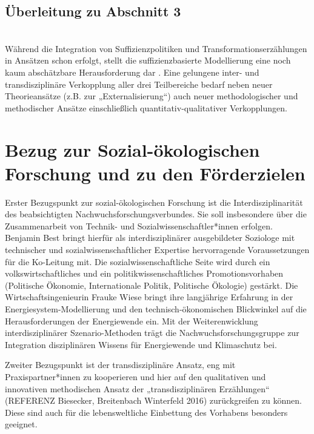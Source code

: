 \documentclass[a4paper,11pt,twoside]{scrartcl}
\begin{document}

\subsection*{Überleitung zu Abschnitt 3}\\
Während die Integration von Suffizienzpolitiken und Transformationserzählungen in Ansätzen schon erfolgt, stellt die suffizienzbasierte Modellierung eine noch kaum abschätzbare Herausforderung dar \cite{Samadi2017}. Eine gelungene inter- und transdisziplinäre Verkopplung aller drei Teilbereiche bedarf neben neuer Theorieansätze (z.B. zur „Externalisierung“) auch neuer methodologischer und methodischer Ansätze einschließlich quantitativ-qualitativer Verkopplungen.

\section{Bezug zur Sozial-ökologischen Forschung und zu den Förderzielen}

Erster Bezugspunkt zur sozial-ökologischen Forschung ist die Interdisziplinarität des beabsichtigten Nachwuchsforschungsverbundes. Sie soll insbesondere über die Zusammenarbeit von Technik- und Sozialwissenschaftler*innen erfolgen. Benjamin Best bringt hierfür als interdisziplinärer ausgebildeter Soziologe mit technischer und sozialwissenschaftlicher Expertise hervorragende Voraussetzungen für die Ko-Leitung mit. Die sozialwissenschaftliche Seite wird durch ein volkswirtschaftliches und ein politikwissenschaftliches Promotionsvorhaben (Politische Ökonomie, Internationale Politik, Politische Ökologie) gestärkt. Die Wirtschaftsingenieurin Frauke Wiese bringt ihre langjährige Erfahrung in der Energiesystem-Modellierung und den technisch-ökonomischen Blickwinkel auf die Herausforderungen der Energiewende ein. Mit der Weiterenwicklung interdisziplinärer Szenario-Methoden trägt die Nachwuchsforschungsgruppe zur Integration disziplinären Wissens für Energiewende und Klimaschutz bei.

Zweiter Bezugspunkt ist der transdisziplinäre Ansatz, eng mit Praxispartner*innen zu kooperieren und hier auf den qualitativen und innovativen methodischen Ansatz der „transdisziplinären Erzählungen“ (REFERENZ Biesecker, Breitenbach Winterfeld 2016) zurückgreifen zu können. Diese sind auch für die lebensweltliche Einbettung des Vorhabens besonders geeignet.
\end{document}
